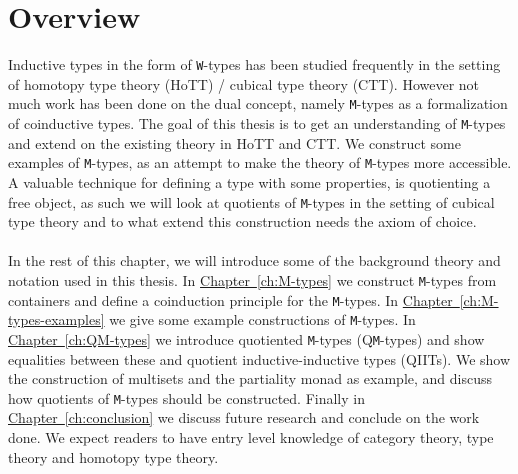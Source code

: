 \documentclass[twoside,11pt,openright]{report}
\theoremstyle{plain} %
\theoremstyle{definition}
\theoremstyle{remark}
\newcommand*{\chapterref}[1]{\hyperref[ch:#1]{Chapter~\ref*{ch:#1}}}
\begin{document}
\section{Overview}
Inductive types in the form of \texttt{W}-types has been studied frequently in the setting of homotopy type theory (HoTT) / cubical type theory (CTT). However not much work has been done on the dual concept, namely \texttt{M}-types as a formalization of coinductive types. The goal of this thesis is to get an understanding of \texttt{M}-types and extend on the existing theory in HoTT and CTT. We construct some examples of \texttt{M}-types, as an attempt to make the theory of \texttt{M}-types more accessible. A valuable technique for defining a type with some properties, is quotienting a free object, as such we will look at quotients of \texttt{M}-types in the setting of cubical type theory and to what extend this construction needs the axiom of choice.
\\ \\
In the rest of this chapter, we will introduce some of the background theory and notation used in this thesis. In \chapterref{M-types} we construct \texttt{M}-types from containers and define a coinduction principle for the \texttt{M}-types. In \chapterref{M-types-examples} we give some example constructions of \texttt{M}-types. In \chapterref{QM-types} we introduce quotiented \texttt{M}-types (Q\texttt{M}-types) and show equalities between these and quotient inductive-inductive types (QIITs). We show the construction of multisets and the partiality monad as example, and discuss how quotients of \texttt{M}-types should be constructed. Finally in \chapterref{conclusion} we discuss future research and conclude on the work done. We expect readers to have entry level knowledge of category theory, type theory and homotopy type theory.
\end{document}
